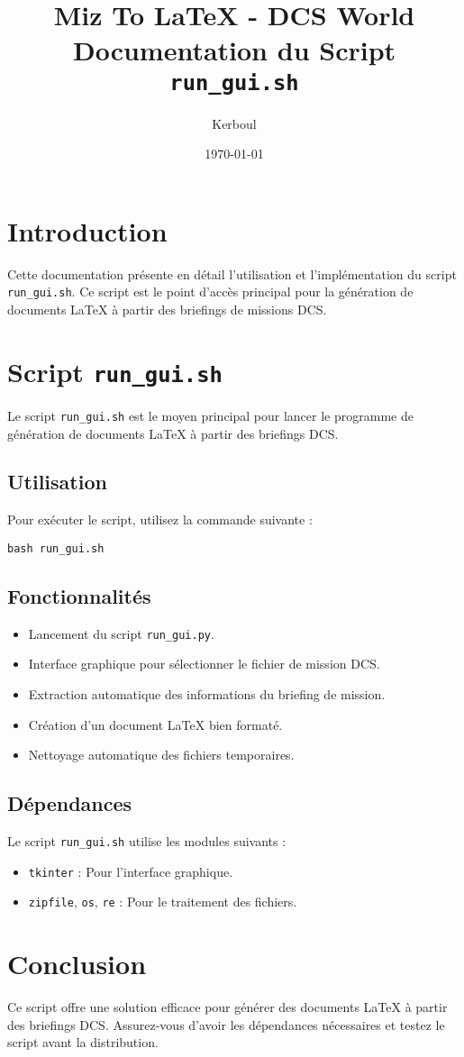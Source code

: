 \documentclass{article}
\title{Miz To LaTeX - DCS World\\ \large Documentation du Script \texttt{run\_gui.sh}}
\author{Kerboul}
\date{\today}
\begin{document}
\maketitle

\section{Introduction}
Cette documentation présente en détail l'utilisation et l'implémentation du script \texttt{run\_gui.sh}. Ce script est le point d'accès principal pour la génération de documents LaTeX à partir des briefings de missions DCS.

\section{Script \texttt{run\_gui.sh}}
Le script \texttt{run\_gui.sh} est le moyen principal pour lancer le programme de génération de documents LaTeX à partir des briefings DCS.

\subsection{Utilisation}
Pour exécuter le script, utilisez la commande suivante :
\begin{verbatim}
bash run_gui.sh
\end{verbatim}

\subsection{Fonctionnalités}
\begin{itemize}
    \item Lancement du script \texttt{run\_gui.py}.
    \item Interface graphique pour sélectionner le fichier de mission DCS.
    \item Extraction automatique des informations du briefing de mission.
    \item Création d'un document LaTeX bien formaté.
    \item Nettoyage automatique des fichiers temporaires.
\end{itemize}

\subsection{Dépendances}
Le script \texttt{run\_gui.sh} utilise les modules suivants :
\begin{itemize}
    \item \texttt{tkinter} : Pour l'interface graphique.
    \item \texttt{zipfile}, \texttt{os}, \texttt{re} : Pour le traitement des fichiers.
\end{itemize}

\section{Conclusion}
Ce script offre une solution efficace pour générer des documents LaTeX à partir des briefings DCS. Assurez-vous d'avoir les dépendances nécessaires et testez le script avant la distribution.
\end{document}
